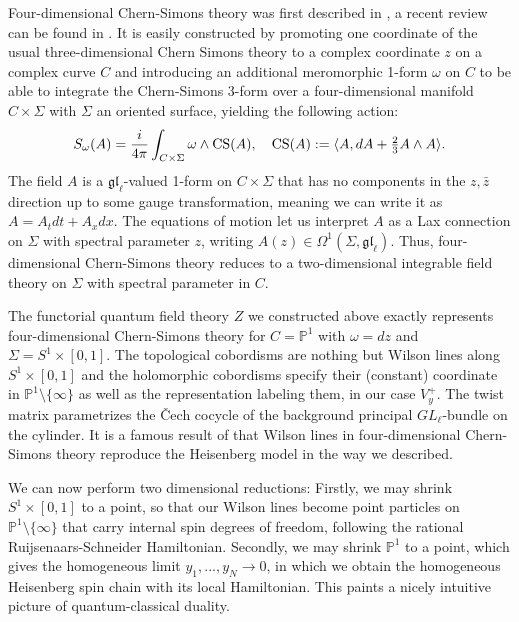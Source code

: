 \documentclass[11pt]{report}
\theoremstyle{definition}
\theoremstyle{remark}
\theoremstyle{remark}
\renewcommand{\P}{\mathbb{P}}
\begin{document}
Four-dimensional Chern-Simons theory was first described in \cite{article:costello:2013}, a recent review can be found in \cite{article:lacroix:2022}. It is easily constructed by promoting one coordinate of the usual three-dimensional Chern Simons theory to a complex coordinate $z$ on a complex curve $C$ and introducing an additional meromorphic 1-form $\omega$ on $C$ to be able to integrate the Chern-Simons 3-form over a four-dimensional manifold $C \times \Sigma$ with $\Sigma$ an oriented surface, yielding the following action:
\begin{equation*}
S_\omega(A) = \frac{i}{4\pi} \int_{C \times \Sigma} \omega \wedge \textnormal{CS}(A), \quad \textnormal{CS}(A) := \langle A, dA + \tfrac 23 A \wedge A \rangle.
\end{equation*}
The field $A$ is a $\mathfrak{gl}_\ell$-valued 1-form on $C \times \Sigma$ that has no components in the $z,\bar z$ direction up to some gauge transformation, meaning we can write it as $A = A_t dt + A_x dx$. The equations of motion let us interpret $A$ as a Lax connection on $\Sigma$ with spectral parameter $z$, writing $A(z) \in \Omega^1(\Sigma,\mathfrak{gl}_\ell)$. Thus, four-dimensional Chern-Simons theory reduces to a two-dimensional integrable field theory on $\Sigma$ with spectral parameter in $C$.

The functorial quantum field theory $Z$ we constructed above exactly represents four-dimen\-sional Chern-Simons theory for $C=\P^1$ with $\omega = dz$ and $\Sigma = S^1 \times [0,1]$. The topological cobordisms are nothing but Wilson lines along $S^1 \times [0,1]$ and the holomorphic cobordisms specify their (constant) coordinate in $\P^1 \setminus \{ \infty \}$ as well as the representation labeling them, in our case $V_y^+$. The twist matrix parametrizes the \v Cech cocycle of the background principal $GL_\ell$-bundle on the cylinder. It is a famous result of \cite{article:costello:2013} that Wilson lines in four-dimensional Chern-Simons theory reproduce the Heisenberg model in the way we described.

We can now perform two dimensional reductions: Firstly, we may shrink $S^1 \times [0,1]$ to a point, so that our Wilson lines become point particles on $\P^1 \setminus \{ \infty \}$ that carry internal spin degrees of freedom, following the rational Ruijsenaars-Schneider Hamiltonian. Secondly, we may shrink $\P^1$ to a point, which gives the homogeneous limit $y_1,...,y_N \to 0$, in which we obtain the homogeneous Heisenberg spin chain with its local Hamiltonian. This paints a nicely intuitive picture of quantum-classical duality.
\end{document}
